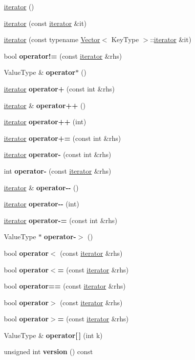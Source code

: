 \begin{DoxyCompactItemize}
\item 
\mbox{\hyperlink{classLinkedHashMap_1_1iterator_a67d652c2433cf9217ed2a1485092fdd1}{iterator}} ()
\item 
\mbox{\hyperlink{classLinkedHashMap_1_1iterator_a698b7553261e7209d6c29fb55627dce4}{iterator}} (const \mbox{\hyperlink{classLinkedHashMap_1_1iterator}{iterator}} \&it)
\item 
\mbox{\hyperlink{classLinkedHashMap_1_1iterator_a3729f4eed7b472132c87cac58a398e43}{iterator}} (const typename \mbox{\hyperlink{classVector}{Vector}}$<$ Key\+Type $>$\+::\mbox{\hyperlink{classLinkedHashMap_1_1iterator}{iterator}} \&it)
\item 
bool {\bfseries operator!=} (const \mbox{\hyperlink{classLinkedHashMap_1_1iterator}{iterator}} \&rhs)
\item 
Value\+Type \& {\bfseries operator$\ast$} ()
\item 
\mbox{\hyperlink{classLinkedHashMap_1_1iterator}{iterator}} {\bfseries operator+} (const int \&rhs)
\item 
\mbox{\hyperlink{classLinkedHashMap_1_1iterator}{iterator}} \& {\bfseries operator++} ()
\item 
\mbox{\hyperlink{classLinkedHashMap_1_1iterator}{iterator}} {\bfseries operator++} (int)
\item 
\mbox{\hyperlink{classLinkedHashMap_1_1iterator}{iterator}} {\bfseries operator+=} (const int \&rhs)
\item 
\mbox{\hyperlink{classLinkedHashMap_1_1iterator}{iterator}} {\bfseries operator-\/} (const int \&rhs)
\item 
int {\bfseries operator-\/} (const \mbox{\hyperlink{classLinkedHashMap_1_1iterator}{iterator}} \&rhs)
\item 
\mbox{\hyperlink{classLinkedHashMap_1_1iterator}{iterator}} \& {\bfseries operator-\/-\/} ()
\item 
\mbox{\hyperlink{classLinkedHashMap_1_1iterator}{iterator}} {\bfseries operator-\/-\/} (int)
\item 
\mbox{\hyperlink{classLinkedHashMap_1_1iterator}{iterator}} {\bfseries operator-\/=} (const int \&rhs)
\item 
Value\+Type $\ast$ {\bfseries operator-\/$>$} ()
\item 
bool {\bfseries operator$<$} (const \mbox{\hyperlink{classLinkedHashMap_1_1iterator}{iterator}} \&rhs)
\item 
bool {\bfseries operator$<$=} (const \mbox{\hyperlink{classLinkedHashMap_1_1iterator}{iterator}} \&rhs)
\item 
bool {\bfseries operator==} (const \mbox{\hyperlink{classLinkedHashMap_1_1iterator}{iterator}} \&rhs)
\item 
bool {\bfseries operator$>$} (const \mbox{\hyperlink{classLinkedHashMap_1_1iterator}{iterator}} \&rhs)
\item 
bool {\bfseries operator$>$=} (const \mbox{\hyperlink{classLinkedHashMap_1_1iterator}{iterator}} \&rhs)
\item 
Value\+Type \& {\bfseries operator\mbox{[}$\,$\mbox{]}} (int k)
\item 
unsigned int {\bfseries version} () const
\end{DoxyCompactItemize}


